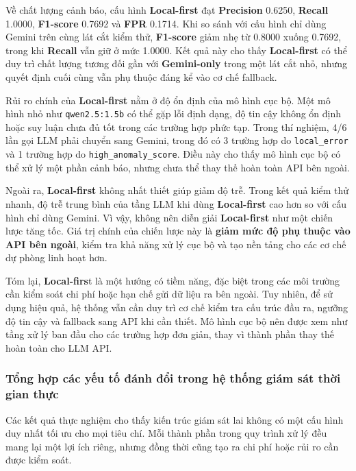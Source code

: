 Về chất lượng cảnh báo, cấu hình \textbf{Local-first} đạt \textbf{Precision} 0.6250, \textbf{Recall} 1.0000,\textbf{ F1-score} 0.7692 và \textbf{FPR} 0.1714. Khi so sánh với cấu hình chỉ dùng Gemini trên cùng lát cắt kiểm thử, \textbf{F1-score} giảm nhẹ từ 0.8000 xuống 0.7692, trong khi \textbf{Recall} vẫn giữ ở mức 1.0000. Kết quả này cho thấy \textbf{Local-first} có thể duy trì chất lượng tương đối gần với \textbf{Gemini-only} trong một lát cắt nhỏ, nhưng quyết định cuối cùng vẫn phụ thuộc đáng kể vào cơ chế fallback.

Rủi ro chính của \textbf{Local-first} nằm ở độ ổn định của mô hình cục bộ. Một mô hình nhỏ như \texttt{qwen2.5:1.5b} có thể gặp lỗi định dạng, độ tin cậy không ổn định hoặc suy luận chưa đủ tốt trong các trường hợp phức tạp. Trong thí nghiệm, 4/6 lần gọi LLM phải chuyển sang Gemini, trong đó có 3 trường hợp do \texttt{local\_error} và 1 trường hợp do \texttt{high\_anomaly\_score}. Điều này cho thấy mô hình cục bộ có thể xử lý một phần cảnh báo, nhưng chưa thể thay thế hoàn toàn API bên ngoài.

Ngoài ra, \textbf{Local-first} không nhất thiết giúp giảm độ trễ. Trong kết quả kiểm thử nhanh, độ trễ trung bình của tầng LLM khi dùng \textbf{Local-first} cao hơn so với cấu hình chỉ dùng Gemini. Vì vậy, không nên diễn giải \textbf{Local-first} như một chiến lược tăng tốc. Giá trị chính của chiến lược này là \textbf{giảm mức độ phụ thuộc vào API bên ngoài}, kiểm tra khả năng xử lý cục bộ và tạo nền tảng cho các cơ chế dự phòng linh hoạt hơn.

Tóm lại, \textbf{Local-firs}t là một hướng có tiềm năng, đặc biệt trong các môi trường cần kiểm soát chi phí hoặc hạn chế gửi dữ liệu ra bên ngoài. Tuy nhiên, để sử dụng hiệu quả, hệ thống vẫn cần duy trì cơ chế kiểm tra cấu trúc đầu ra, ngưỡng độ tin cậy và fallback sang API khi cần thiết. Mô hình cục bộ nên được xem như tầng xử lý ban đầu cho các trường hợp đơn giản, thay vì thành phần thay thế hoàn toàn cho LLM API.

\subsubsection{
Tổng hợp các yếu tố đánh đổi trong hệ thống giám sát thời gian thực}

Các kết quả thực nghiệm cho thấy kiến trúc giám sát lai không có một cấu hình duy nhất tối ưu cho mọi tiêu chí. Mỗi thành phần trong quy trình xử lý đều mang lại một lợi ích riêng, nhưng đồng thời cũng tạo ra chi phí hoặc rủi ro cần được kiểm soát.


